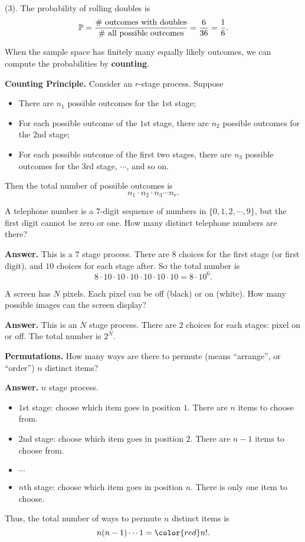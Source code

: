   (3). The probability of rolling doubles is
  \[
    \mathbb{P} = \frac{\# ~\text{outcomes with doubles}}{\#~\text{all possible
        outcomes}} = \frac{6}{36} = \frac{1}{6}.
  \]

  \begin{remark}
    When the sample space has finitely many equally likely outcomes, we can
    compute the probabilities by \textbf{counting}.
  \end{remark}

  \textbf{Counting Principle.} Consider an $r$-stage process. Suppose
  \begin{itemize}
  \item There are $n_1$ possible outcomes for the $1$st stage;
  \item For each possible outcome of the $1$st stage, there are $n_2$ possible
    outcomes for the $2$nd stage;
  \item For each possible outcome of the first two stages, there are $n_3$
    possible outcomes for the $3$rd stage, $\cdots$, and so on.
  \end{itemize}
  Then the total number of possible outcomes is
  \[
    n_1\cdot n_2\cdot n_3\cdots n_r.
  \]

  \begin{example}
    A telephone number is a $7$-digit sequence of numbers in $\{0,1,2,\cdots,
    9\}$, but the first digit cannot be zero or one. How many distinct telephone
    numbers are there?
  \end{example}

  \textbf{Answer.} This is a $7$ stage process. There are $8$ choices for the
  first stage (or first digit), and $10$ choices for each stage after. So the
  total number is
  \[
    8\cdot 10\cdot 10\cdot 10\cdot 10\cdot 10\cdot 10 = 8\cdot 10^6.
  \]

  \begin{example}
    A screen has $N$ pixels. Each pixel can be off (black) or on (white). How
    many possible images can the screen display?
  \end{example}

  \textbf{Answer.} This is an $N$ stage process. There are $2$ choices for each
  stages: pixel on or off. The total number is $2^N$.

  \textbf{Permutations.} How many ways are there to permute (means ``arrange'',
  or ``order'') $n$ distinct items?

  \textbf{Answer.} $n$ stage process. 
  \begin{itemize}
  \item $1$st stage: choose which item goes in position $1$. There are $n$ items
    to choose from.
  \item $2$nd stage: choose which item goes in position $2$. There are $n-1$
    items to choose from.
  \item $\cdots$
  \item $n$th stage: choose which item goes in position $n$. There
    is only one item to choose.
  \end{itemize}
  Thus, the total number of ways to permute $n$ distinct items is
  \[
    n(n-1)\cdots 1 = {\color{red} n!}.
  \]

